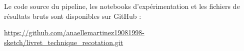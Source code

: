 



Le code source du pipeline, les notebooks d'expérimentation et les fichiers
de résultats bruts sont disponibles sur GitHub :

\begin{center}
\url{https://github.com/anaellemartinez19081998-sketch/livret_technique_recotation.git}
\end{center}

